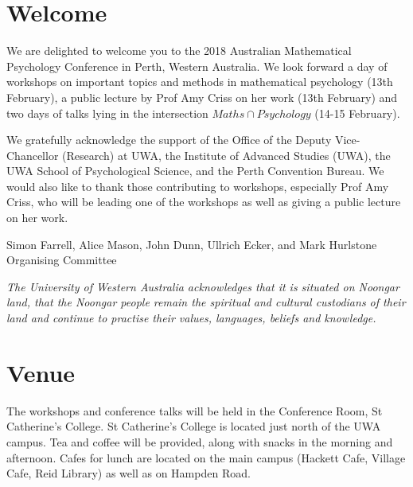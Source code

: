 \documentclass[]{article}
\begin{document}
\pagebreak

\section{Welcome}\label{welcome}

We are delighted to welcome you to the 2018 Australian Mathematical
Psychology Conference in Perth, Western Australia. We look forward a day
of workshops on important topics and methods in mathematical psychology
(13th February), a public lecture by Prof Amy Criss on her work (13th
February) and two days of talks lying in the intersection
\(Maths \cap Psychology\) (14-15 February).

We gratefully acknowledge the support of the Office of the Deputy
Vice-Chancellor (Research) at UWA, the Institute of Advanced Studies
(UWA), the UWA School of Psychological Science, and the Perth Convention
Bureau. We would also like to thank those contributing to workshops,
especially Prof Amy Criss, who will be leading one of the workshops as
well as giving a public lecture on her work.

\vspace{0.5cm}

Simon Farrell, Alice Mason, John Dunn, Ullrich Ecker, and Mark Hurlstone
Organising Committee

\vspace{1cm}

\emph{The University of Western Australia acknowledges that it is
situated on Noongar land, that the Noongar people remain the spiritual
and cultural custodians of their land and continue to practise their
values, languages, beliefs and knowledge.}

\pagebreak

\section{Venue}\label{venue}

The workshops and conference talks will be held in the Conference Room,
St Catherine's College. St Catherine's College is located just north of
the UWA campus. Tea and coffee will be provided, along with snacks in
the morning and afternoon. Cafes for lunch are located on the main
campus (Hackett Cafe, Village Cafe, Reid Library) as well as on Hampden
Road.
\end{document}
